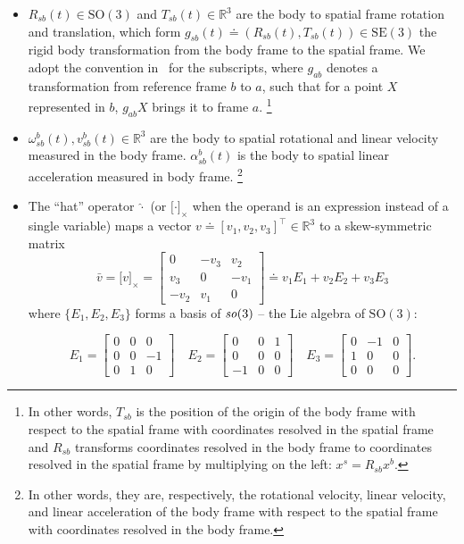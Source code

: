 \documentclass[letter,10pt]{article}
\newcommand{\SE}[1]{ \mathrm{SE(#1)} }
\newcommand{\SO}[1]{ \mathrm{SO(#1)} }
\newcommand{\real}{\mathbb{R}}
\newcommand{\asym}[1]{{\lbrack #1\rbrack}_\times{}}
\begin{document}
\begin{itemize}
 \item 
$R_{sb}(t) \in \SO{3}$ and $T_{sb}(t) \in \real^3$ are the body to spatial frame rotation and translation, which form $g_{sb}(t)\doteq (R_{sb}(t), T_{sb}(t)) \in \SE{3}$ the rigid body transformation from the body frame to the spatial frame. We adopt the convention in~\cite{maSKS} for the subscripts, where $g_{ab}$ denotes a transformation from reference frame $b$ to $a$, such that for a point $X$ represented in $b$, $g_{ab} X$ brings it to frame $a$. \footnote{In other words, $T_{sb}$ is the position of the origin of the body frame with respect to the spatial frame with coordinates resolved in the spatial frame and $R_{sb}$ transforms coordinates resolved in the body frame to coordinates resolved in the spatial frame by multiplying on the left: $x^s = R_{sb}x^b$.}

\item
$\omega_{sb}^b(t), v_{sb}^b(t)\in \real^3$ are the body to spatial rotational and linear velocity measured in the body frame. $\alpha_{sb}^b(t)$ is the body to spatial linear acceleration measured in body frame. \footnote{In other words, they are, respectively, the rotational velocity, linear velocity, and linear acceleration of the body frame with respect to the spatial frame with coordinates resolved in the body frame.}

\item
The ``hat'' operator $\hat{\cdot}$ (or $\asym{\cdot}$ when the operand is an expression instead of a single variable) maps a vector $v \doteq [v_1, v_2, v_3]^\top \in \real^3$ to a skew-symmetric matrix 
$$
\bar{v}=
\asym{v}=
\begin{bmatrix}
    0 & -v_3 & v_2 \\
    v_3 & 0 & -v_1 \\
    -v_2 & v_1 & 0
\end{bmatrix}
\doteq v_1 E_1 + v_2 E_2 + v_3 E_3$$ 
where $\{E_1, E_2, E_3\}$ forms a basis of ${\it so}(3)$ -- the Lie algebra of $\SO{3}$:

\begin{equation}
E_1=
\begin{bmatrix}
0 & 0 & 0 \\
0 & 0 & -1 \\
0 & 1 & 0
\end{bmatrix}
\quad
E_2=
\begin{bmatrix}
0 & 0 & 1 \\
0 & 0 & 0 \\
-1 & 0 & 0
\end{bmatrix}
\quad
E_3=
\begin{bmatrix}
0 & -1 & 0 \\
1 & 0 & 0 \\
0 & 0 & 0
\end{bmatrix}.
\end{equation}



\end{itemize}
\end{document}
